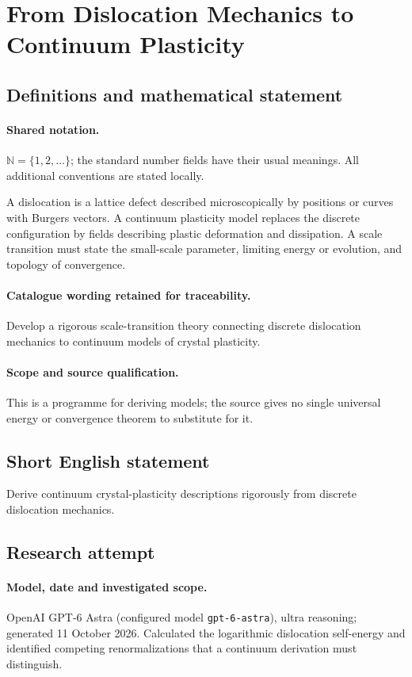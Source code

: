 \documentclass[11pt]{article}
\begin{document}
\section{From Dislocation Mechanics to Continuum Plasticity}\label{statement}

\subsection{Definitions and mathematical statement}

\paragraph{Shared notation.}$\mathbb N=\{1,2,\ldots\}$; the standard number fields have their usual meanings. All additional conventions are stated locally.


A dislocation is a lattice defect described microscopically by positions or curves with Burgers vectors. A continuum plasticity model replaces the discrete configuration by fields describing plastic deformation and dissipation. A scale transition must state the small-scale parameter, limiting energy or evolution, and topology of convergence.

\paragraph{Catalogue wording retained for traceability.}
Develop a rigorous scale-transition theory connecting discrete dislocation mechanics to continuum models of crystal plasticity.

\paragraph{Scope and source qualification.}This is a programme for deriving models; the source gives no single universal energy or convergence theorem to substitute for it.
\subsection{Short English statement}
Derive continuum crystal-plasticity descriptions rigorously from discrete dislocation mechanics.
\subsection{Research attempt}
\paragraph{Model, date and investigated scope.}
OpenAI GPT-6 Astra (configured model \texttt{gpt-6-astra}), ultra reasoning; generated 11 October 2026. Calculated the logarithmic dislocation self-energy and identified competing renormalizations that a continuum derivation must distinguish.
\end{document}
